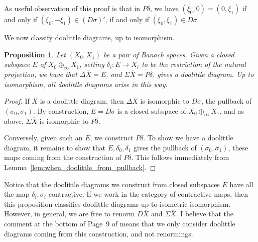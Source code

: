 \documentclass[a4paper,11pt]{article}
\theoremstyle{plain}
\newtheorem{proposition}{Proposition}[section]
\theoremstyle{remark}
\newenvironment{remark}
  {\pushQED{\qed}\renewcommand{\qedsymbol}{$\triangle$}\remarkx}
  {\popQED\endremarkx}
\begin{document}
\begin{remark}\label{rem:when_equal_in_sigma}
As useful observation of this proof is that in $P\delta$, we have $(\xi_0,0) = (0,\xi_1)$ if and only if $(\xi_0, -\xi_1) \in (D\sigma)'$, if and only if $(\xi_0, \xi_1) \in D\sigma$.
\end{remark}

We now classify doolittle diagrams, up to isomorphism.

\begin{proposition}\label{prop:classification_doolittle}
Let $(X_0, X_1)$ be a pair of Banach spaces.  Given a closed subspace $E$ of $X_0 \oplus_\infty X_1$, setting $\delta_i \colon E \to X_i$ to be the restriction of the natural projection, we have that $\Delta\overline X = E$, and $\Sigma\overline X = P\delta$, gives a doolittle diagram.  Up to isomorphism, all doolittle diagrams arise in this way.
\end{proposition}
\begin{proof}
If $\overline X$ is a doolittle diagram, then $\Delta\overline X$ is isomorphic to $D\sigma$, the pullback of $(\sigma_0, \sigma_1)$.  By construction, $E = D\sigma$ is a closed subspace of $X_0 \oplus_\infty X_1$, and as above, $\Sigma\overline X$ is isomorphic to $P\delta$.

Conversely, given such an $E$, we construct $P\delta$.  To show we have a doolittle diagram, it remains to show that $E, \delta_0, \delta_1$ gives the pullback of $(\sigma_0, \sigma_1)$, these maps coming from the construction of $P\delta$.
This follows immediately from Lemma~\ref{lem:when_doolittle_from_pullback}.
\end{proof}

Notice that the doolittle diagrams we construct from closed subspaces $E$ have all the map $\delta_i, \sigma_i$ contractive.
If we work in the category of contractive maps, then this proposition classifies doolittle diagrams up to isometric isomorphism.  However, in general, we are free to renorm $D\overline X$ and $\Sigma\overline X$.  I believe that the comment at the bottom of Page~9 of \cite{KP_InterpolationFunctorsDuality} means that we only consider doolittle diagrams coming from this construction, and not renormings.
\end{document}

